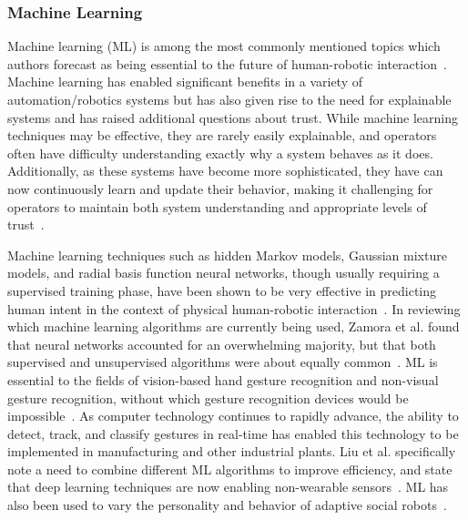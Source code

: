 \subsubsection{Machine Learning}
Machine learning (ML) is among the most commonly mentioned topics which authors forecast as being essential to the future of human-robotic interaction~\citep{wang_current_2018}.
Machine learning has enabled significant benefits in a variety of automation/robotics systems but has also given rise to the need for explainable systems and has raised additional questions about trust.
While machine learning techniques may be effective, they are rarely easily explainable, and operators often have difficulty understanding exactly why a system behaves as it does.
Additionally, as these systems have become more sophisticated, they have can now continuously learn and update their behavior, making it challenging for operators to maintain both system understanding and appropriate levels of trust~\citep{chen_humanagent_2014}.

Machine learning techniques such as hidden Markov models, Gaussian mixture models, and radial basis function neural networks, though usually requiring a supervised training phase, have been shown to be very effective in predicting human intent in the context of physical human-robotic interaction~\citep{losey_review_2018}.
In reviewing which machine learning algorithms are currently being used, Zamora et al. found that neural networks accounted for an overwhelming majority, but that both supervised and unsupervised algorithms were about equally common~\citep{zamora_machine_2017}.
ML is essential to the fields of vision-based hand gesture recognition and non-visual gesture recognition, without which gesture recognition devices would be impossible~\citep{rautaray_vision_2015, 8701742, liu_gesture_2018}.
As computer technology continues to rapidly advance, the ability to detect, track, and classify gestures in real-time has enabled this technology to be implemented in manufacturing and other industrial plants.
Liu et al. specifically note a need to combine different ML algorithms to improve efficiency, and state that deep learning techniques are now enabling non-wearable sensors~\citep{liu_gesture_2018}.
ML has also been used to vary the personality and behavior of adaptive social robots~\citep{ahmad_systematic_2017}.

